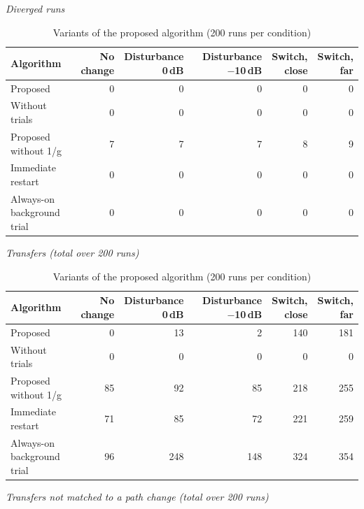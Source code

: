 \begin{table}[tbp]
\centering
\footnotesize
\setlength{\tabcolsep}{4pt}
\caption{Variants of the proposed algorithm (200 runs per condition)}
\label{tab:atsip-4}
\par\medskip
\textit{Diverged runs}\par\smallskip
\begin{tabular}{lrrrrr}
\toprule
Algorithm & \makecell{No\\change} & \makecell{Disturbance\\0\,dB} & \makecell{Disturbance\\$-$10\,dB} & \makecell{Switch,\\close} & \makecell{Switch,\\far} \\
\midrule
Proposed & 0 & 0 & 0 & 0 & 0 \\
Without trials & 0 & 0 & 0 & 0 & 0 \\
Proposed without 1/g & 7 & 7 & 7 & 8 & 9 \\
Immediate restart & 0 & 0 & 0 & 0 & 0 \\
\makecell[l]{Always-on\\background trial} & 0 & 0 & 0 & 0 & 0 \\
\bottomrule
\end{tabular}
\par\medskip
\textit{Transfers (total over 200 runs)}\par\smallskip
\begin{tabular}{lrrrrr}
\toprule
Algorithm & \makecell{No\\change} & \makecell{Disturbance\\0\,dB} & \makecell{Disturbance\\$-$10\,dB} & \makecell{Switch,\\close} & \makecell{Switch,\\far} \\
\midrule
Proposed & 0 & 13 & 2 & 140 & 181 \\
Without trials & 0 & 0 & 0 & 0 & 0 \\
Proposed without 1/g & 85 & 92 & 85 & 218 & 255 \\
Immediate restart & 71 & 85 & 72 & 221 & 259 \\
\makecell[l]{Always-on\\background trial} & 96 & 248 & 148 & 324 & 354 \\
\bottomrule
\end{tabular}
\par\medskip
\textit{Transfers not matched to a path change (total over 200 runs)}\par\smallskip

\end{table}
